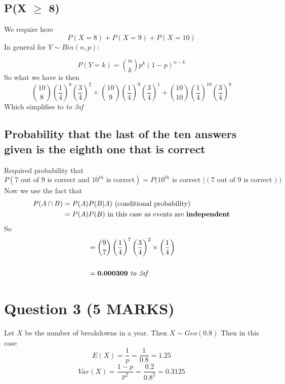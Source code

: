 \documentclass[11pt]{article}
\begin{document}
\subsection{P(X $\geq$ 8)}
 We require here
 \begin{equation*}
     P(X=8) + P(X=9) + P(X=10)
 \end{equation*}
 In general for $Y\sim Bin(n,p) :$

\begin{equation*}
    P(Y=k) = \binom{n}{k} p^{k} (1-p)^{n-k}
\end{equation*}
So what we have is then
\begin{equation*}
    \binom{10}{8} \left(\frac{1}{4} \right)^{8} \left(\frac{3}{4}\right)^{2} +
    \binom{10}{9} \left(\frac{1}{4} \right)^{9} \left(\frac{3}{4}\right)^{1}+
    \binom{10}{10} \left(\frac{1}{4} \right)^{10} \left(\frac{3}{4}\right)^{0}
\end{equation*}
Which simplifies to  \emph{to 3sf}
\subsection{Probability that the last of the ten answers given is the eighth one that is correct}
Required probability that
\begin{equation*}
    P(7 \text{ out of } 9 \text{ is correct and } 10^{th} \text{ is correct}) = P(10^{th} \text{ is correct } | (7 \text{ out of } 9 \text{ is correct )} )
\end{equation*}
Now we use the fact that
\begin{align*}
    P(A \cap B) &= P(A)P(B|A) \text{ (conditional probability)} \\
                &= P(A)P(B) \text{ in this case as events are \textbf{independent}}
\end{align*}
So
\begin{align*}
    &=\binom{9}{7}\left(\frac{1}{4}\right)^{7} \left(\frac{3}{4}\right)^{2} \times \left(\frac{1}{4}\right) \\ \\
    &= \bm{0.000309 \text{\emph{ to 3sf}}}
\end{align*}

\section{Question 3 (5 MARKS)}
Let $X$ be the number of breakdowns in a year. Then $ X \sim Geo(0.8)$ Then in this case
\begin{equation*}
    E(X) = \frac{1}{p} = \frac{1}{0.8} = 1.25
\end{equation*}
\begin{equation*}
        Var(X) = \frac{1-p}{p^{2}} = \frac{0.2}{0.8^{2}} = 0.3125
\end{equation*}
\end{document}

